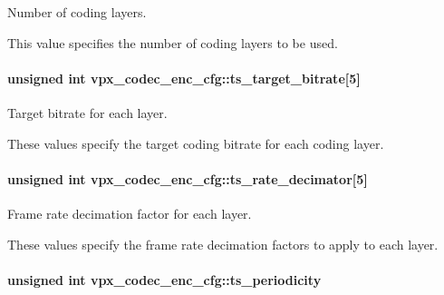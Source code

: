 \-Number of coding layers. 

\-This value specifies the number of coding layers to be used. \hypertarget{structvpx__codec__enc__cfg_aba7ceb7a90500a8f76aff89575737f3a}{
\paragraph[{ts\-\_\-target\-\_\-bitrate}]{\setlength{\rightskip}{0pt plus 5cm}unsigned int {\bf vpx\-\_\-codec\-\_\-enc\-\_\-cfg\-::ts\-\_\-target\-\_\-bitrate}\mbox{[}5\mbox{]}}}\label{structvpx__codec__enc__cfg_aba7ceb7a90500a8f76aff89575737f3a}


\-Target bitrate for each layer. 

\-These values specify the target coding bitrate for each coding layer. \hypertarget{structvpx__codec__enc__cfg_ad40c30846ef8ef1d8684f10a491ec535}{
\paragraph[{ts\-\_\-rate\-\_\-decimator}]{\setlength{\rightskip}{0pt plus 5cm}unsigned int {\bf vpx\-\_\-codec\-\_\-enc\-\_\-cfg\-::ts\-\_\-rate\-\_\-decimator}\mbox{[}5\mbox{]}}}\label{structvpx__codec__enc__cfg_ad40c30846ef8ef1d8684f10a491ec535}


\-Frame rate decimation factor for each layer. 

\-These values specify the frame rate decimation factors to apply to each layer. \hypertarget{structvpx__codec__enc__cfg_a4ec338780115dd270acf0dac24193474}{
\paragraph[{ts\-\_\-periodicity}]{\setlength{\rightskip}{0pt plus 5cm}unsigned int {\bf vpx\-\_\-codec\-\_\-enc\-\_\-cfg\-::ts\-\_\-periodicity}}}\label{structvpx__codec__enc__cfg_a4ec338780115dd270acf0dac24193474}


